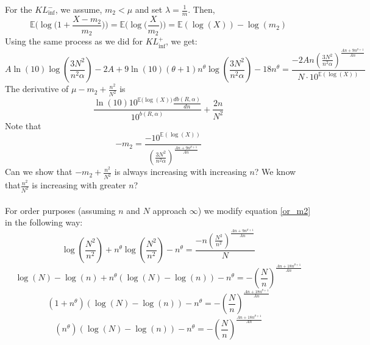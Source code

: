 \documentclass{article}
\newcommand{\aadit}[1]{\begingroup\color{orange}#1\endgroup}
\begin{document}
\noindent For the $KL^-_{\text{inf}}$, we assume, $m_2 < \mu$ and set $\lambda = \frac{1}{m}$.
Then,
\begin{equation}
    \mathbb{E}\Big(\log\Big(1 + \frac{X - m_2}{m_2}\Big)\Big) = \mathbb{E}\Big(\log\Big(\frac{X}{m_2}\Big)\Big) = \mathbb{E}(\log(X)) - \log(m_2)
\end{equation}
Using the same process as we did for $KL^+_{\text{inf}}$, we get: 
\begin{equation} \label{or_m2}
A \ln(10) \log\left( \frac{3 N^2}{n^2 \alpha} \right) - 2A + 9\ln(10)(\theta + 1)n^{\theta} \log\left( \frac{3 N^2}{n^2 \alpha} \right) - 18n^\theta = \frac{-2 An \left( \frac{3 N^2}{n^2 \alpha} \right)^{\frac{A n + 9 n^{\theta + 1}}{A n}}}{N \cdot 10^{\mathbb{E}( \log(X))}}
\end{equation}
The derivative of $\mu - m_2 + \frac{n^2}{N^2}$ is 
\begin{equation}
    \frac{\ln(10)10^{\mathbb{E}\Big(\log(X)\Big)}\frac{db(R,\alpha)}{dn}}{10^{b(R,\alpha)}} + \frac{2n}{N^2}
\end{equation}
Note that
\begin{equation}
-m_2 = \frac{-10^{\mathbb{E} \left( \log(X) \right)}}{\left( \frac{3 N^2}{n^2 \alpha} \right)^{\frac{A n + 9 n^{\theta + 1}}{A n}}}
\end{equation} 
\aadit{Can we show that $-m_2 + \frac{n^2}{N^2}$ is always increasing with increasing $n$? We know that$\frac{n^2}{N^2}$ is increasing with greater $n$?} \\ \\
\noindent For order purposes (assuming $n$ and $N$ approach $\infty$) we modify equation \eqref{or_m2} in the following way:
\begin{equation}
\log\left( \frac{N^2}{n^2} \right) +n^{\theta} \log\left( \frac{N^2}{n^2} \right) -n^{\theta} =\frac{-n \left( \frac{N^2}{n^2} \right)^{\frac{A n + 9 n^{\theta + 1}}{A n}}}{N}
\end{equation}
\begin{equation}
\log(N) - \log(n) + n^\theta (\log(N) - \log(n)) - n^\theta = -\left( \frac{N}{n} \right)^{\frac{A n + 18 n^{\theta + 1}}{A n}}
\end{equation}
\begin{equation}
(1 + n^\theta) (\log(N) - \log(n)) - n^\theta = -\left( \frac{N}{n} \right)^{\frac{A n + 18 n^{\theta + 1}}{A n}}
\end{equation}
\begin{equation}
(n^\theta) (\log(N) - \log(n)) - n^\theta = -\left( \frac{N}{n} \right)^{\frac{A n + 18 n^{\theta + 1}}{A n}}
\end{equation}
\end{document}
